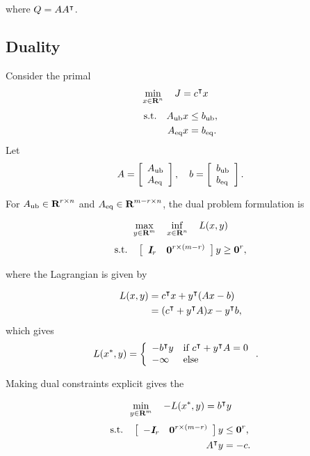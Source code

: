 \documentclass{article}
\begin{document}
where $Q=AA^\intercal$.  

\clearpage

    \subsection{\LP Duality}
    Consider the primal \LP 
    \begin{align*}
        \min_{x\in\textbf{R}^n}\quad
        J
        &=
                c^\intercal x
    \end{align*}
    \begin{align*}
        \text{s.t.}\quad A_{\text{ub}} x&\leq b_{\text{ub}},\\
        A_{\text{eq}} x &= b_{\text{eq}}.\\
    \end{align*}
    Let
    \begin{align*}
        A = \left[\begin{array}{lllllllllllllllllll}A_{\text{ub}} \\ A_{\text{eq}}\end{array}\right],\quad
        b = \left[\begin{array}{lllllllllllllllllll}b_{\text{ub}}\\b_{\text{eq}}\end{array}\right].
    \end{align*}


    For $A_{\text{ub}}\in\textbf{R}^{{r}\times n}$ and $A_{\text{eq}}\in\textbf{R}^{m-r\times n}$, the dual problem formulation is

    \begin{align*}
        \max_{y\in\textbf{R}^m}\quad 
        \inf_{x\in\textbf{R}^n}\quad L(x,y)
    \end{align*}
    \begin{align*}
        \text{s.t.}\quad  \left[\begin{array}{lllllllllllllllllll}\emph{\textbf{I}}_{r}&\textbf{0}^{{r}\times (m-{r})}\end{array}\right]y\geq \textbf{0}^{r},
    \end{align*}

    where the Lagrangian is given by

    \begin{align*}
        L(x,y) &= c^\intercal x 
        + y^\intercal (A x - b)\\
        &= (c^\intercal +y^\intercal A )x   
        -y^\intercal b,
    \end{align*}
    which gives
    \begin{align*}
        L(x^*,y) 
        &= \left\{\begin{array}{lllllllllllllllllll}-b^\intercal y & \text{if $c^\intercal +y^\intercal A = 0 $}\\
        -\infty & \text{else} \end{array}\right..
    \end{align*}

    Making dual constraints explicit gives the \LP

    \begin{align}
        \min_{y\in\textbf{R}^m}\quad -L(x^*,y)=b^\intercal y
    \end{align}
    \begin{align*}
        \text{s.t.}\quad  \left[\begin{array}{lllllllllllllllllll}-\emph{\textbf{I}}_{r}&\textbf{0}^{{r}\times (m-{r})}\end{array}\right]y&\leq \textbf{0}^{r},\\
        A^\intercal y &=-c.
    \end{align*}
\end{document}
